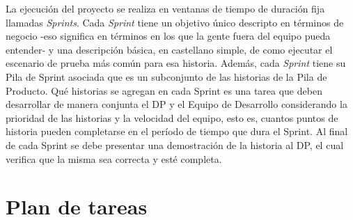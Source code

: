 La ejecución del proyecto se realiza en ventanas de tiempo de duración fija llamadas \textit{Sprints}. Cada \textit{Sprint} tiene un objetivo único descripto en términos de negocio -eso significa en términos en los que la gente fuera del equipo pueda entender- y una descripción básica, en castellano simple, de como ejecutar el escenario de prueba más común para esa historia. Además, cada \textit{Sprint} tiene su Pila de Sprint asociada que es un subconjunto de las historias de la Pila de Producto. Qué historias se agregan en cada Sprint es una tarea que deben desarrollar de manera conjunta el DP y el Equipo de Desarrollo considerando la prioridad de las historias y la velocidad del equipo, esto es, cuantos puntos de historia pueden completarse en el período de tiempo que dura el Sprint. Al final de cada Sprint se debe presentar una demostración de la historia al DP, el cual verifica que la misma sea correcta y esté completa.

\section*{Plan de tareas}
